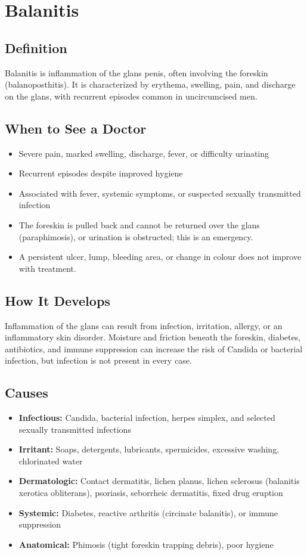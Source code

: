 \chapter{Balanitis}

\section*{Definition}
Balanitis is inflammation of the glans penis, often involving the foreskin (balanoposthitis). It is characterized by erythema, swelling, pain, and discharge on the glans, with recurrent episodes common in uncircumcised men.

\section*{When to See a Doctor}

\begin{itemize}
 \item Severe pain, marked swelling, discharge, fever, or difficulty urinating
 \item Recurrent episodes despite improved hygiene
 \item Associated with fever, systemic symptoms, or suspected sexually transmitted infection
 \item The foreskin is pulled back and cannot be returned over the glans (paraphimosis), or urination is obstructed; this is an emergency.
 \item A persistent ulcer, lump, bleeding area, or change in colour does not improve with treatment.
\end{itemize}

\section*{How It Develops}
Inflammation of the glans can result from infection, irritation, allergy, or an inflammatory skin disorder. Moisture and friction beneath the foreskin, diabetes, antibiotics, and immune suppression can increase the risk of Candida or bacterial infection, but infection is not present in every case.

\section*{Causes}
\begin{itemize}
 \item \textbf{Infectious:} Candida, bacterial infection, herpes simplex, and selected sexually transmitted infections
 \item \textbf{Irritant:} Soaps, detergents, lubricants, spermicides, excessive washing, chlorinated water
 \item \textbf{Dermatologic:} Contact dermatitis, lichen planus, lichen sclerosus (balanitis xerotica obliterans), psoriasis, seborrheic dermatitis, fixed drug eruption
 \item \textbf{Systemic:} Diabetes, reactive arthritis (circinate balanitis), or immune suppression
 \item \textbf{Anatomical:} Phimosis (tight foreskin trapping debris), poor hygiene
\end{itemize}

